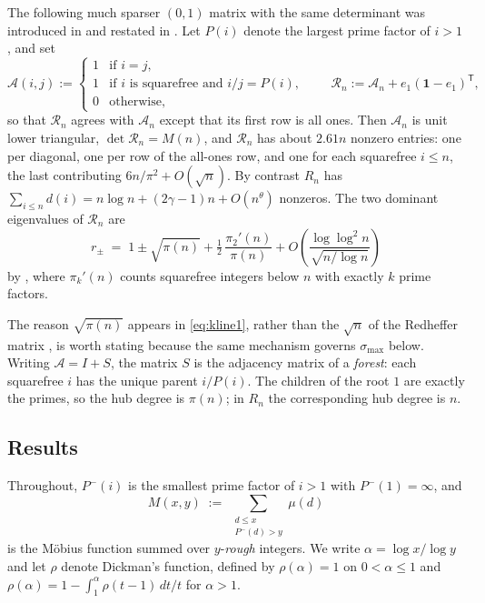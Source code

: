 \documentclass[11pt]{article}
\theoremstyle{definition}
\theoremstyle{remark}
\newcommand{\Rc}{\mathcal{R}}
\newcommand{\Ac}{\mathcal{A}}
\newcommand{\Pp}{P}
\newcommand{\Pm}{P^{-}}
\begin{document}
The following much sparser $(0,1)$ matrix with the same determinant was
introduced in \cite{kline581} and restated in \cite[\S1]{kline584}. Let
$\Pp(i)$ denote the largest prime factor
of $i>1$, and set
\begin{equation}\label{eq:defA}
  \Ac(i,j) :=
  \begin{cases}
    1 & \text{if } i=j,\\
    1 & \text{if } i \text{ is squarefree and } i/j=\Pp(i),\\
    0 & \text{otherwise,}
  \end{cases}
  \qquad
  \Rc_n := \Ac_n + e_1(\mathbf 1-e_1)^{\mathsf T},
\end{equation}
so that $\Rc_n$ agrees with $\Ac_n$ except that its first row is all ones. Then
$\Ac_n$ is unit lower triangular, $\det\Rc_n=M(n)$, and $\Rc_n$ has about $2.61n$
nonzero entries: one per diagonal, one per row of the all-ones row, and one for
each squarefree $i\le n$, the last contributing $6n/\pi^2+O(\sqrt n)$. By contrast
$R_n$ has $\sum_{i\le n}d(i)=n\log n+(2\gamma-1)n+O(n^{\theta})$ nonzeros. The two
dominant eigenvalues of $\Rc_n$ are
\begin{equation}\label{eq:kline1}
  r_\pm \;=\; 1\pm\sqrt{\pi(n)}+\tfrac12\,\frac{\pi_2'(n)}{\pi(n)}
  +O\!\left(\frac{\log\log^2 n}{\sqrt{n/\log n}}\right)
\end{equation}
by \cite[Thm.~1]{kline584}, where $\pi_k'(n)$ counts squarefree integers below
$n$ with exactly $k$ prime factors.

The reason $\sqrt{\pi(n)}$ appears in \eqref{eq:kline1}, rather than the $\sqrt n$
of the Redheffer matrix \cite[Thm.~1]{barrettjarvis}, is worth stating because the
same mechanism governs $\sigma_{\max}$ below. Writing $\Ac=I+S$, the matrix $S$ is
the adjacency matrix of a \emph{forest}: each squarefree $i$ has the unique parent
$i/\Pp(i)$. The children of the root $1$ are exactly the primes, so the hub degree
is $\pi(n)$; in $R_n$ the corresponding hub degree is $n$.

\subsection{Results}

Throughout, $\Pm(i)$ is the smallest prime factor of $i>1$ with
$\Pm(1)=\infty$, and
\begin{equation}\label{eq:defMxy}
  M(x,y) \;:=\; \sum_{\substack{d\le x\\ \Pm(d)>y}}\mu(d)
\end{equation}
is the M\"obius function summed over $y$-\emph{rough} integers. We write
$\alpha=\log x/\log y$ and let $\rho$ denote Dickman's function, defined by
$\rho(\alpha)=1$ on $0<\alpha\le1$ and $\rho(\alpha)=1-\int_1^\alpha
\rho(t-1)\,dt/t$ for $\alpha>1$.
\end{document}
